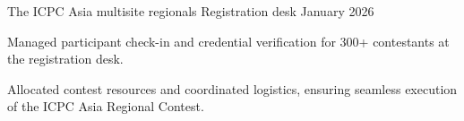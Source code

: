 
\resumeProject
  {The ICPC Asia multisite regionals}
  {Registration desk}
  {January 2026}
  {{} }
\resumeItemListStart
  \item Managed participant check-in and credential verification for 300+ contestants at the registration desk.
  \item Allocated contest resources and coordinated logistics, ensuring seamless execution of the ICPC Asia Regional Contest.
\resumeItemListEnd